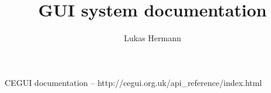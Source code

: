 \documentclass[12pt, a4paper]{article}
\begin{document}
\title{GUI system documentation}
\author{Lukas Hermann}
\maketitle

\tableofcontents

\newpage



\begin{thebibliography}{9}
CEGUI documentation -- http://cegui.org.uk/api\_reference/index.html
\end{thebibliography}
\end{document}
